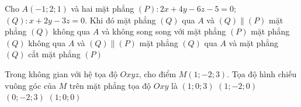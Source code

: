 \begin{ex}%
Cho $A(-1;2;1)$ và hai mặt phẳng $(P) \colon 2x+4y-6z-5=0$; $(Q)\colon  x+2y-3z=0$. Khi đó 
\choice
	{\True mặt phẳng $(Q)$ qua $A$ và $(Q) \parallel (P)$}
	{mặt phẳng $(Q)$ không qua $A$ và không song song với mặt phẳng $(P)$}
	{mặt phẳng $(Q)$ không qua $A$ và $(Q) \parallel (P)$}
	{ mặt phẳng $(Q)$ qua $A$ và mặt phẳng $(Q)$ cắt mặt phẳng $(P)$}
\end{ex}

\begin{ex}%
Trong không gian với hệ tọa độ $Oxyz$, cho điểm $M(1;-2;3)$. Tọa độ hình chiếu vuông góc của $M$ trên mặt phẳng tọa độ $Oxy$ là
\choice
	{ $(1;0;3) $}
	{\True $(1;-2;0) $}
	{$(0;-2;3) $}
	{ $(1;0;0) $}
\end{ex}


